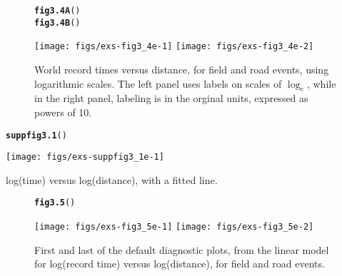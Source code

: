 \documentclass[12pt, a4paper,  BCOR=8.25mm, DIV=15]{scrartcl}\usepackage[]{graphicx}\usepackage[]{color}
\makeatletter
\newcommand{\hlstd}[1]{\textcolor[rgb]{0.345,0.345,0.345}{#1}}%
\newcommand{\hlkwd}[1]{\textcolor[rgb]{0.737,0.353,0.396}{\textbf{#1}}}%
\newenvironment{kframe}{%
 \def\at@end@of@kframe{}%
 \ifinner\ifhmode%
  \def\at@end@of@kframe{\end{minipage}}%
  \begin{minipage}{\columnwidth}%
 \fi\fi%
 \def\FrameCommand##1{\hskip\@totalleftmargin \hskip-\fboxsep
 \colorbox{shadecolor}{##1}\hskip-\fboxsep
     \hskip-\linewidth \hskip-\@totalleftmargin \hskip\columnwidth}%
 \MakeFramed {\advance\hsize-\width
   \@totalleftmargin\z@ \linewidth\hsize
   \@setminipage}}%
 {\par\unskip\endMakeFramed%
 \at@end@of@kframe}
\newenvironment{knitrout}{}{} %
\makeatother
\begin{document}
\begin{figure}
\begin{knitrout}
\color{fgcolor}\begin{kframe}
\begin{alltt}
\hlkwd{fig3.4A}\hlstd{()}
\hlkwd{fig3.4B}\hlstd{()}
\end{alltt}
\end{kframe}

{\centering \texttt{[image: figs/exs-fig3\_4e-1]} 
\texttt{[image: figs/exs-fig3\_4e-2]} 

}



\end{knitrout}
\caption{World record times versus distance, for field and road
  events, using logarithmic scales.  The left panel uses labels on
  scales of $\log_e$, while in the right panel, labeling is in the
  orginal units, expressed as powers of 10.}
\label{fig:wrlog}
\end{figure}

\begin{suppfigure}
\begin{knitrout}
\color{fgcolor}\begin{kframe}
\begin{alltt}
\hlkwd{suppfig3.1}\hlstd{()}
\end{alltt}
\end{kframe}

{\centering \texttt{[image: figs/exs-suppfig3\_1e-1]} 

}



\end{knitrout}
\caption{log(time) versus log(distance), with a fitted line.}
\end{suppfigure}

\begin{figure}
\begin{knitrout}
\color{fgcolor}\begin{kframe}
\begin{alltt}
\hlkwd{fig3.5}\hlstd{()}
\end{alltt}
\end{kframe}

{\centering \texttt{[image: figs/exs-fig3\_5e-1]} 
\texttt{[image: figs/exs-fig3\_5e-2]} 

}



\end{knitrout}
      \caption{First and last of the default diagnostic plots, from the
        linear model for log(record time) versus log(distance), for
        field and road events.}
\label{fig:wr-diag}
\end{figure}
\end{document}
